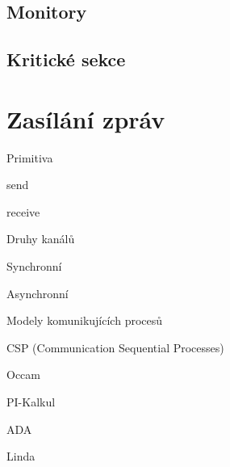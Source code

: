 \subsection{Monitory}

\begin{compactitem}
    \item {}
\end{compactitem}

\subsection{Kritické sekce}

\begin{compactitem}
    \item {}
\end{compactitem}


\section{Zasílání zpráv}

\begin{compactitem}
    \item Primitiva \begin{compactitem}
        \item send
        \item receive
    \end{compactitem}

    \item Druhy kanálů \begin{compactitem}
        \item Synchronní
        \item Asynchronní
    \end{compactitem}

    \item Modely komunikujících procesů \begin{compactitem}
        \item CSP (Communication Sequential Processes)
        \item Occam
        \item PI-Kalkul
        \item ADA
        \item Linda
    \end{compactitem}
\end{compactitem}
